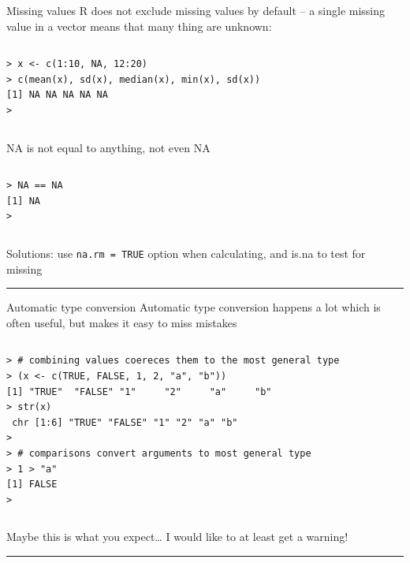 \documentclass[table,smaller]{beamer}
\begin{document}
\begin{frame}[fragile,label=sec-8-3]{Missing values}
 R does not exclude missing values by default -- a single missing value in a vector means that many thing are unknown:
\vspace{-.5em}
\begin{columns}
\begin{block}{}
\begin{verbatim}
> x <- c(1:10, NA, 12:20)
> c(mean(x), sd(x), median(x), min(x), sd(x))
[1] NA NA NA NA NA
>
\end{verbatim}
\end{block}
\end{columns}
\vspace{.5em}

NA is not equal to anything, not even NA
\vspace{-.5em}
\begin{columns}
\begin{block}{}
\begin{verbatim}
> NA == NA
[1] NA
>
\end{verbatim}
\end{block}
\end{columns}
\vspace{.5em}

Solutions: use \verb~na.rm = TRUE~ option when calculating, and is.na to test for missing

\rule{\linewidth}{0.5pt}
\end{frame}
\begin{frame}[fragile,label=sec-8-4]{Automatic type conversion}
 Automatic type conversion happens a lot which is often useful, but makes it easy to miss mistakes

\vspace{-.5em}
\begin{columns}
\begin{block}{}
\begin{verbatim}
> # combining values coereces them to the most general type
> (x <- c(TRUE, FALSE, 1, 2, "a", "b"))
[1] "TRUE"  "FALSE" "1"     "2"     "a"     "b"    
> str(x)
 chr [1:6] "TRUE" "FALSE" "1" "2" "a" "b"
> 
> # comparisons convert arguments to most general type
> 1 > "a"
[1] FALSE
>
\end{verbatim}
\end{block}
\end{columns}
\vspace{.5em}

Maybe this is what you expect\ldots{} I would like to at least get a warning!

\rule{\linewidth}{0.5pt}
\end{frame}
\end{document}
